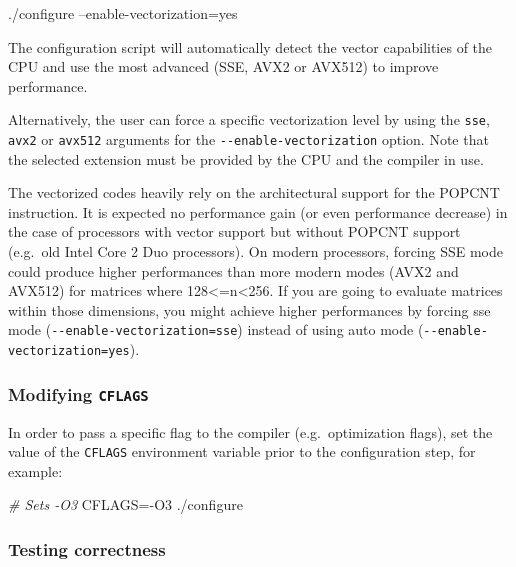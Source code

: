 \documentclass[]{article}
\newenvironment{Shaded}{}{}
\newcommand{\CommentTok}[1]{\textcolor[rgb]{0.38,0.63,0.69}{\textit{#1}}}
\newcommand{\ExtensionTok}[1]{#1}
\newcommand{\NormalTok}[1]{#1}
\newcommand{\VariableTok}[1]{\textcolor[rgb]{0.10,0.09,0.49}{#1}}
\begin{document}
\begin{Shaded}
\begin{Highlighting}[]
\ExtensionTok{./configure}\NormalTok{ --enable-vectorization=yes}
\end{Highlighting}
\end{Shaded}

The configuration script will automatically detect the vector
capabilities of the CPU and use the most advanced (SSE, AVX2 or AVX512)
to improve performance.

Alternatively, the user can force a specific vectorization level by
using the \texttt{sse}, \texttt{avx2} or \texttt{avx512} arguments for
the \texttt{-\/-enable-vectorization} option. Note that the selected
extension must be provided by the CPU and the compiler in use.

The vectorized codes heavily rely on the architectural support for the
POPCNT instruction. It is expected no performance gain (or even
performance decrease) in the case of processors with vector support but
without POPCNT support (e.g.~old Intel Core 2 Duo processors). On modern
processors, forcing SSE mode could produce higher performances than more
modern modes (AVX2 and AVX512) for matrices where
128\textless{}=n\textless{}256. If you are going to evaluate matrices
within those dimensions, you might achieve higher performances by
forcing sse mode (\texttt{-\/-enable-vectorization=sse}) instead of
using auto mode (\texttt{-\/-enable-vectorization=yes}).

\hypertarget{modifying-cflags}{%
\subsubsection{\texorpdfstring{Modifying
\texttt{CFLAGS}}{Modifying CFLAGS}}\label{modifying-cflags}}

In order to pass a specific flag to the compiler (e.g.~optimization
flags), set the value of the \texttt{CFLAGS} environment variable prior
to the configuration step, for example:

\begin{Shaded}
\begin{Highlighting}[]
\CommentTok{# Sets -O3}
\VariableTok{CFLAGS=}\NormalTok{-O3 }\ExtensionTok{./configure} 
\end{Highlighting}
\end{Shaded}

\hypertarget{testing-correctness}{%
\subsubsection{Testing correctness}\label{testing-correctness}}
\end{document}
